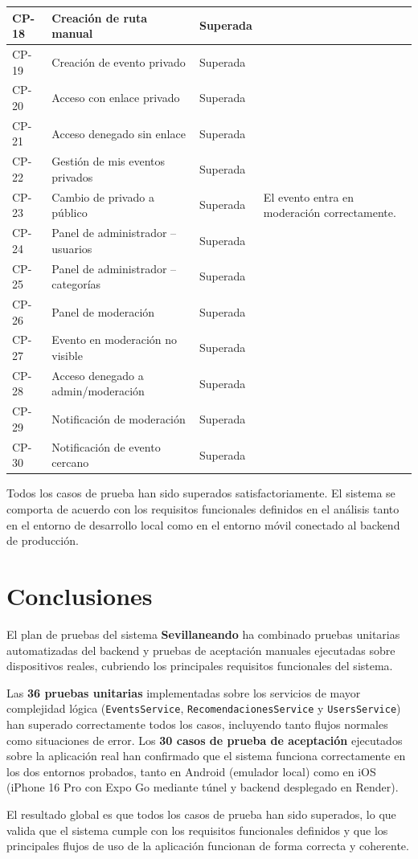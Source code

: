 \begin{longtable}{|p{1.3cm}|p{4.5cm}|p{2.8cm}|p{6cm}|}
\hline
CP-18 & Creación de ruta manual & Superada & \\
\hline
CP-19 & Creación de evento privado & Superada & \\
\hline
CP-20 & Acceso con enlace privado & Superada & \\
\hline
CP-21 & Acceso denegado sin enlace & Superada & \\
\hline
CP-22 & Gestión de mis eventos privados & Superada & \\
\hline
CP-23 & Cambio de privado a público & Superada & El evento entra en moderación correctamente. \\
\hline
CP-24 & Panel de administrador -- usuarios & Superada & \\
\hline
CP-25 & Panel de administrador -- categorías & Superada & \\
\hline
CP-26 & Panel de moderación & Superada & \\
\hline
CP-27 & Evento en moderación no visible & Superada & \\
\hline
CP-28 & Acceso denegado a admin/moderación & Superada & \\
\hline
CP-29 & Notificación de moderación & Superada & \\
\hline
CP-30 & Notificación de evento cercano & Superada & \\
\hline
\end{longtable}

Todos los casos de prueba han sido superados satisfactoriamente. El sistema se comporta de acuerdo con los requisitos funcionales definidos en el análisis tanto en el entorno de desarrollo local como en el entorno móvil conectado al backend de producción.

\section{Conclusiones}

El plan de pruebas del sistema \textbf{Sevillaneando} ha combinado pruebas unitarias automatizadas del backend y pruebas de aceptación manuales ejecutadas sobre dispositivos reales, cubriendo los principales requisitos funcionales del sistema.

Las \textbf{36 pruebas unitarias} implementadas sobre los servicios de mayor complejidad lógica (\texttt{EventsService}, \texttt{RecomendacionesService} y \texttt{UsersService}) han superado correctamente todos los casos, incluyendo tanto flujos normales como situaciones de error. Los \textbf{30 casos de prueba de aceptación} ejecutados sobre la aplicación real han confirmado que el sistema funciona correctamente en los dos entornos probados, tanto en Android (emulador local) como en iOS (iPhone 16 Pro con Expo Go mediante túnel y backend desplegado en Render).

El resultado global es que todos los casos de prueba han sido superados, lo que valida que el sistema cumple con los requisitos funcionales definidos y que los principales flujos de uso de la aplicación funcionan de forma correcta y coherente.
